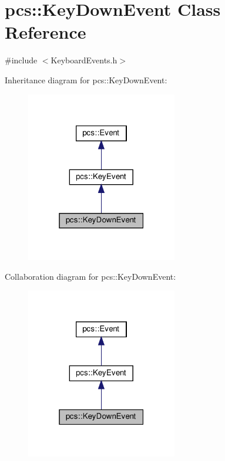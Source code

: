 \hypertarget{classpcs_1_1KeyDownEvent}{}\section{pcs\+:\+:Key\+Down\+Event Class Reference}
\label{classpcs_1_1KeyDownEvent}


{\ttfamily \#include $<$Keyboard\+Events.\+h$>$}



Inheritance diagram for pcs\+:\+:Key\+Down\+Event\+:\nopagebreak
\begin{figure}[H]
\begin{center}
\leavevmode
\includegraphics[width=187pt]{classpcs_1_1KeyDownEvent__inherit__graph}
\end{center}
\end{figure}


Collaboration diagram for pcs\+:\+:Key\+Down\+Event\+:\nopagebreak
\begin{figure}[H]
\begin{center}
\leavevmode
\includegraphics[width=187pt]{classpcs_1_1KeyDownEvent__coll__graph}
\end{center}
\end{figure}
